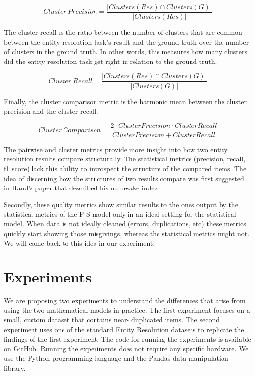 \documentclass[11pt]{article}
\begin{document}
    \[
        Cluster~Precision = \frac{|Clusters(Res) \cap Clusters(G)|}{
            |Clusters(Res)|
        }
    \]

    The cluster recall is the ratio between the number of clusters that are
    common between the entity resolution task's result and the ground truth over
    the number of clusters in the ground truth.
    In other words, this measures how many clusters did the entity resolution
    task get right in relation to the ground truth.

    \[
        Cluster~Recall = \frac{|Clusters(Res) \cap Clusters(G)|}{
            |Clusters(G)|
        }
    \]

    Finally, the cluster comparison metric is the harmonic mean between the
    cluster precision and the cluster recall.

    \[
        Cluster~Comparison = \frac{
            2 \cdot Cluster Precision \cdot Cluster Recall
        }{Cluster Precision + Cluster Recall}
    \]

    The pairwise and cluster metrics provide more insight into how two entity
    resolution results compare structurally.
    The statistical metrics (precision, recall, f1 score) lack this ability to
    introspect the structure of the compared items.
    The idea of discerning how the structures of two results compare was first
    suggested in Rand's paper that described his namesake index\cite{rand1971}.
    
    Secondly, these quality metrics show similar results to the ones output by
    the statistical metrics of the F-S model only in an ideal setting for the
    statistical model.
    When data is not ideally cleaned (errors, duplications, etc) these metrics
    quickly start showing those misgivings, whereas the statistical metrics
    might not.
    We will come back to this idea in our experiment.

    \section{Experiments}

    We are proposing two experiments to understand the differences that arise
    from using the two mathematical models in practice.
    The first experiment focuses on a small, custom dataset that contains near-
    duplicated items.
    The second experiment uses one of the standard Entity Resolution datasets
    to replicate the findings of the first experiment.
    The code for running the experiments is available on GitHub\cite{matchescu}.
    Running the experiments does not require any specific hardware.
    We use the Python\cite{python} programming language and the
    Pandas\cite{pandas2023} data manipulation library.
\end{document}
